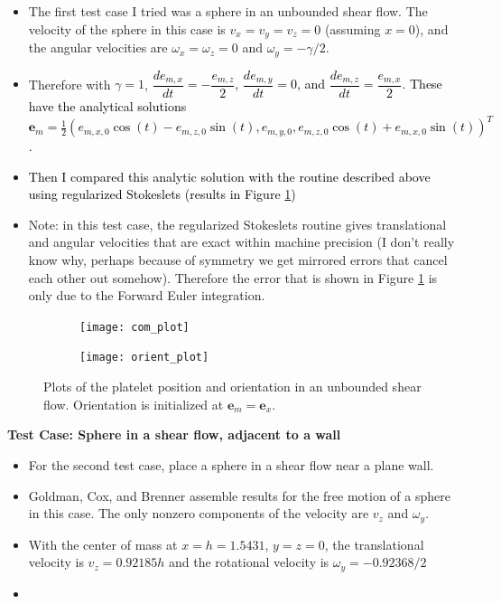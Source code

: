 \documentclass{article}
\newcommand{\vect}[1]{\boldsymbol{\mathbf{#1}}}
\begin{document}
{\color{gray}
\begin{itemize}
\item The first test case I tried was a sphere in an unbounded shear
  flow. The velocity of the sphere in this case is $v_x = v_y = v_z =
  0$ (assuming $x = 0$), and the angular velocities are $\omega_x =
  \omega_z = 0$ and $\omega_y = -\gamma/2$.
\item Therefore with $\gamma = 1$,
  \textcolor{black}{$\dfrac{de_{m,x}}{dt} = -\dfrac{e_{m, z}}{2}$,
    $\dfrac{de_{m, y}}{dt} = 0$, and
    $\dfrac{de_{m,z}}{dt} = \dfrac{e_{m,x}}{2}$. These have the
    analytical solutions
    $\vect{e}_m = \frac{1}{2} (e_{m,x,0} \cos(t) - e_{m,z,0} \sin(t),
    e_{m,y,0}, e_{m,z,0} \cos(t) + e_{m,x,0}\sin(t))^T$.}
\item \textcolor{black}{Then I compared this analytic solution with
    the routine described above using regularized Stokeslets (results
    in Figure \ref{fig:com_plot})}
\item Note: in this test case, the regularized Stokeslets routine
  gives translational and angular velocities that are exact within
  machine precision (I don't really know why, perhaps because of
  symmetry we get mirrored errors that cancel each other out
  somehow). Therefore the error that is shown in Figure
  \ref{fig:com_plot} is only due to the Forward Euler integration. 
\end{itemize}
}

\begin{figure}
  \centering
  \begin{subfigure}{0.49\textwidth}
    \texttt{[image: com\_plot]}    
  \end{subfigure}
  \hfill
  \begin{subfigure}{0.49\textwidth}
    \texttt{[image: orient\_plot]}
  \end{subfigure}
  \caption{Plots of the platelet position and orientation in an
    unbounded shear flow. Orientation is initialized at
    $\vect{e}_m = \vect{e}_x$.}
  \label{fig:com_plot}
\end{figure}

\newpage

\textbf{Test Case: Sphere in a shear flow, adjacent to a wall}

{\color{gray}
\begin{itemize}
\item For the second test case, place a sphere in a shear flow near a
  plane wall.
\item Goldman, Cox, and Brenner \cite{Goldman1967b} assemble results
  for the free motion of a sphere in this case. The only nonzero
  components of the velocity are $v_z$ and $\omega_y$.
\item With the center of mass at $x = h = 1.5431$, $y = z = 0$, the
  translational velocity is $v_z = 0.92185 h$ and the rotational
  velocity is $\omega_y = -0.92368 / 2$
\item 
\end{itemize}
}
\end{document}
